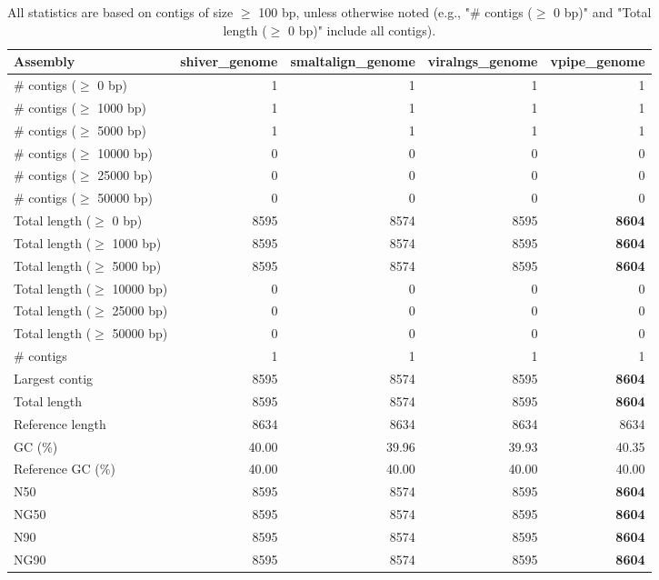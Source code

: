 \documentclass[12pt,a4paper]{article}
\begin{document}
\begin{table}[ht]
\begin{center}
\caption{All statistics are based on contigs of size $\geq$ 100 bp, unless otherwise noted (e.g., "\# contigs ($\geq$ 0 bp)" and "Total length ($\geq$ 0 bp)" include all contigs).}
\begin{tabular}{|l*{4}{|r}|}
\hline
Assembly & shiver\_genome & smaltalign\_genome & viralngs\_genome & vpipe\_genome \\ \hline
\# contigs ($\geq$ 0 bp) & 1 & 1 & 1 & 1 \\ \hline
\# contigs ($\geq$ 1000 bp) & 1 & 1 & 1 & 1 \\ \hline
\# contigs ($\geq$ 5000 bp) & 1 & 1 & 1 & 1 \\ \hline
\# contigs ($\geq$ 10000 bp) & 0 & 0 & 0 & 0 \\ \hline
\# contigs ($\geq$ 25000 bp) & 0 & 0 & 0 & 0 \\ \hline
\# contigs ($\geq$ 50000 bp) & 0 & 0 & 0 & 0 \\ \hline
Total length ($\geq$ 0 bp) & 8595 & 8574 & 8595 & {\bf 8604} \\ \hline
Total length ($\geq$ 1000 bp) & 8595 & 8574 & 8595 & {\bf 8604} \\ \hline
Total length ($\geq$ 5000 bp) & 8595 & 8574 & 8595 & {\bf 8604} \\ \hline
Total length ($\geq$ 10000 bp) & 0 & 0 & 0 & 0 \\ \hline
Total length ($\geq$ 25000 bp) & 0 & 0 & 0 & 0 \\ \hline
Total length ($\geq$ 50000 bp) & 0 & 0 & 0 & 0 \\ \hline
\# contigs & 1 & 1 & 1 & 1 \\ \hline
Largest contig & 8595 & 8574 & 8595 & {\bf 8604} \\ \hline
Total length & 8595 & 8574 & 8595 & {\bf 8604} \\ \hline
Reference length & 8634 & 8634 & 8634 & 8634 \\ \hline
GC (\%) & 40.00 & 39.96 & 39.93 & 40.35 \\ \hline
Reference GC (\%) & 40.00 & 40.00 & 40.00 & 40.00 \\ \hline
N50 & 8595 & 8574 & 8595 & {\bf 8604} \\ \hline
NG50 & 8595 & 8574 & 8595 & {\bf 8604} \\ \hline
N90 & 8595 & 8574 & 8595 & {\bf 8604} \\ \hline
NG90 & 8595 & 8574 & 8595 & {\bf 8604} \\ \hline

\end{tabular}
\end{center}
\end{table}
\end{document}
